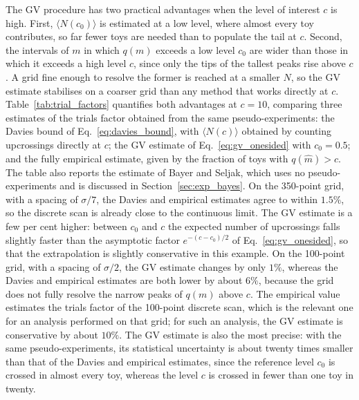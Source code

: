 The GV procedure has two practical advantages when the level of interest $c$ is high. First, $\langle N(c_0)\rangle$ is estimated at a low level, where almost every toy contributes, so far fewer toys are needed than to populate the tail at $c$. Second, the intervals of $m$ in which $q(m)$ exceeds a low level $c_0$ are wider than those in which it exceeds a high level $c$, since only the tips of the tallest peaks rise above $c$. A grid fine enough to resolve the former is reached at a smaller $N$, so the GV estimate stabilises on a coarser grid than any method that works directly at $c$. Table~\ref{tab:trial_factors} quantifies both advantages at $c=10$, comparing three estimates of the trials factor obtained from the same pseudo-experiments: the Davies bound of Eq.~\eqref{eq:davies_bound}, with $\langle N(c)\rangle$ obtained by counting upcrossings directly at $c$; the GV estimate of Eq.~\eqref{eq:gv_onesided} with $c_0=0.5$; and the fully empirical estimate, given by the fraction of toys with $q(\hat m)>c$. The table also reports the estimate of Bayer and Seljak, which uses no pseudo-experiments and is discussed in Section~\ref{sec:exp_bayes}. On the 350-point grid, with a spacing of $\sigma/7$, the Davies and empirical estimates agree to within $1.5\%$, so the discrete scan is already close to the continuous limit. The GV estimate is a few per cent higher: between $c_0$ and $c$ the expected number of upcrossings falls slightly faster than the asymptotic factor $e^{-(c-c_0)/2}$ of Eq.~\eqref{eq:gv_onesided}, so that the extrapolation is slightly conservative in this example. 
On the 100-point grid, with a spacing of $\sigma/2$, the GV estimate changes by only $1\%$, whereas the Davies and empirical estimates are both lower by about $6\%$, because the grid does not fully resolve the narrow peaks of $q(m)$ above $c$. The empirical value estimates the trials factor of the 100-point discrete scan, which is the relevant one for an analysis performed on that grid; for such an analysis, the GV estimate is conservative by about $10\%$. The GV estimate is also the most precise: with the same pseudo-experiments, its statistical uncertainty is about twenty times smaller than that of the Davies and empirical estimates, since the reference level $c_0$ is crossed in almost every toy, whereas the level $c$ is crossed in fewer than one toy in twenty.
